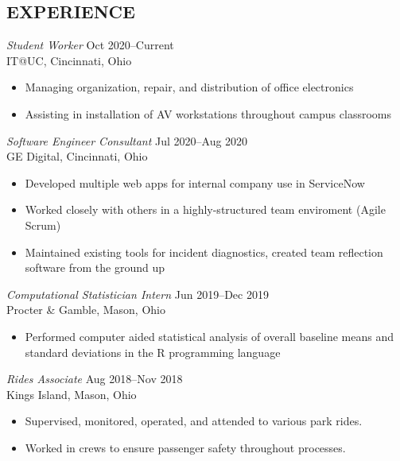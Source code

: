 \documentclass[margin, 10pt]{res} %
\begin{document}
\begin{resume}
 
 
\section{EXPERIENCE}

{\sl Student Worker} \hfill {\color{gray} Oct 2020–Current}  \\
IT@UC, Cincinnati, Ohio 
\begin{itemize} \itemsep -2pt %
\item Managing organization, repair, and distribution of office electronics
\item Assisting in installation of AV workstations throughout campus classrooms
\end{itemize}
 
{\sl Software Engineer Consultant} \hfill {\color{gray} Jul 2020–Aug 2020} \\
GE Digital, Cincinnati, Ohio
\begin{itemize} 
\item Developed multiple web apps for internal company use in ServiceNow
\item Worked closely with others in a highly-structured team enviroment (Agile Scrum)
\item Maintained existing tools for incident diagnostics, created team reflection software from the ground up
\end{itemize} 

{\sl Computational Statistician Intern} \hfill {\color{gray} Jun 2019–Dec 2019} \\
Procter \& Gamble, Mason, Ohio
\begin{itemize}
\item Performed computer aided statistical analysis of overall baseline means and standard deviations in the R programming language
\end{itemize}

{\sl Rides Associate} \hfill {\color{gray}Aug 2018–Nov 2018} \\
Kings Island, Mason, Ohio
\begin{itemize}
\item Supervised, monitored, operated, and attended to various park rides.
\item Worked in crews to ensure passenger safety throughout processes.
\end{itemize}


\end{resume}
\end{document}
